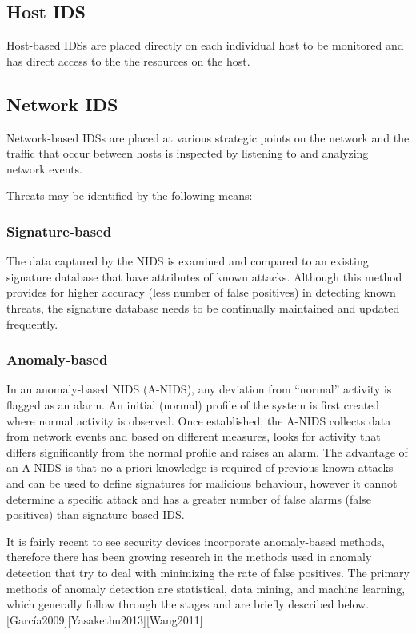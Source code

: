 \documentclass[12pt,]{article}
\begin{document}
\subsection{Host IDS}\label{host-ids}

Host-based IDSs are placed directly on each individual host to be
monitored and has direct access to the the resources on the host.

\subsection{Network IDS}\label{network-ids}

Network-based IDSs are placed at various strategic points on the network
and the traffic that occur between hosts is inspected by listening to
and analyzing network events.

Threats may be identified by the following means:

\subsubsection{Signature-based}\label{signature-based}

The data captured by the NIDS is examined and compared to an existing
signature database that have attributes of known attacks. Although this
method provides for higher accuracy (less number of false positives) in
detecting known threats, the signature database needs to be continually
maintained and updated frequently.

\subsubsection{Anomaly-based}\label{anomaly-based}

In an anomaly-based NIDS (A-NIDS), any deviation from ``normal''
activity is flagged as an alarm. An initial (normal) profile of the
system is first created where normal activity is observed. Once
established, the A-NIDS collects data from network events and based on
different measures, looks for activity that differs significantly from
the normal profile and raises an alarm. The advantage of an A-NIDS is
that no a priori knowledge is required of previous known attacks and can
be used to define signatures for malicious behaviour, however it cannot
determine a specific attack and has a greater number of false alarms
(false positives) than signature-based IDS.

It is fairly recent to see security devices incorporate anomaly-based
methods, therefore there has been growing research in the methods used
in anomaly detection that try to deal with minimizing the rate of false
positives. The primary methods of anomaly detection are statistical,
data mining, and machine learning, which generally follow through the
stages and are briefly described
below.{[}García2009{]}{[}Yasakethu2013{]}{[}Wang2011{]}
\end{document}
